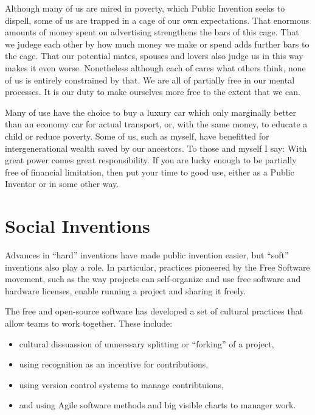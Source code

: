\documentclass[
	fontsize=10pt, %
	twoside=false, %
	secnumdepth=1, %
]{kaobook}
\begin{document}
Although many of us are mired in poverty, which Public Invention
seeks to dispell, some of us are trapped in a cage of our own
expectations. That enormous amounts of money spent
on advertising strengthens the bars of this cage.
That we judege each other by how much money we make
or spend adds further bars to the cage.
That our potential mates, spouses and lovers also judge
us in this way makes it even worse.
Nonetheless although each of cares what others think,
none of us is entirely constrained by that.
We are all of partially free in our mental processes.
It is our duty to make ourselves more free to the extent that we can.

Many of use have the choice to buy a luxury car
which only marginally better than an economy car
for actual transport, or, with the same money,
to educate a child or reduce poverty.
Some of us, such as myself, have benefitted for intergenerational
wealth saved by our ancestors. To those and myself I say: With great
power comes great responsibility. If you are lucky enough to be
partially free of financial limitation, then put your time to good
use, either as a Public Inventor or in some other way.

\chapter{Social Inventions}

Advances in ``hard'' inventions
have made public invention easier,
but ``soft'' inventions also play a role.
In particular, practices pioneered by the Free Software movement,
such as the way projects can self-organize and use
free software and hardware licenses, enable running a
project and sharing it freely.

The free and open-source software has developed a set of cultural
practices that allow teams to work together.  These include:
\begin{itemize}
\item cultural dissuassion of unnecssary splitting or ``forking'' of a
  project,
\item using recognition as an incentive for contributions,
\item using version control systems to manage contribtuions,
\item and using Agile software methods and big visible charts to
  manager work.
\end{itemize}
\end{document}
